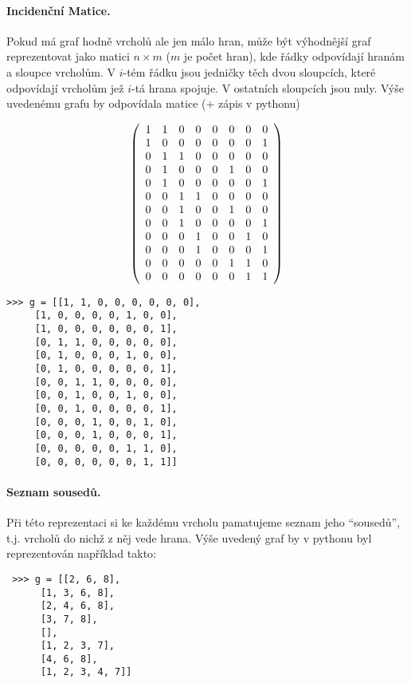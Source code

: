 \paragraph{Incidenční Matice.} Pokud má graf hodně vrcholů ale jen málo hran, může být výhodnější graf reprezentovat jako matici $n\times m$ ($m$ je počet hran), kde řádky
odpovídají hranám a sloupce vrcholům. V $i$-tém řádku jsou jedničky těch dvou sloupcích, které odpovídají vrcholům jež $i$-tá hrana spojuje. V ostatních sloupcích jsou nuly.
Výše uvedenému grafu by odpovídala matice (+ zápis v pythonu)
\begin{center}
\begin{minipage}{3.5cm}
$$
\left(
\begin{array}{cccccccc}
1 & 1 & 0 & 0 & 0 & 0 & 0 & 0\cr
1 & 0 & 0 & 0 & 0 & 0 & 0 & 1\cr
0 & 1 & 1 & 0 & 0 & 0 & 0 & 0\cr
0 & 1 & 0 & 0 & 0 & 1 & 0 & 0\cr
0 & 1 & 0 & 0 & 0 & 0 & 0 & 1\cr
0 & 0 & 1 & 1 & 0 & 0 & 0 & 0\cr
0 & 0 & 1 & 0 & 0 & 1 & 0 & 0\cr
0 & 0 & 1 & 0 & 0 & 0 & 0 & 1\cr
0 & 0 & 0 & 1 & 0 & 0 & 1 & 0\cr
0 & 0 & 0 & 1 & 0 & 0 & 0 & 1\cr
0 & 0 & 0 & 0 & 0 & 1 & 1 & 0\cr
0 & 0 & 0 & 0 & 0 & 0 & 1 & 1\cr
\end{array}
\right)
$$
\end{minipage}
\hskip2cm
\begin{minipage}{7cm}
\begin{verbatim}
>>> g = [[1, 1, 0, 0, 0, 0, 0, 0],
	 [1, 0, 0, 0, 0, 1, 0, 0],
	 [1, 0, 0, 0, 0, 0, 0, 1],
	 [0, 1, 1, 0, 0, 0, 0, 0],
	 [0, 1, 0, 0, 0, 1, 0, 0],
	 [0, 1, 0, 0, 0, 0, 0, 1],
	 [0, 0, 1, 1, 0, 0, 0, 0],
	 [0, 0, 1, 0, 0, 1, 0, 0],
	 [0, 0, 1, 0, 0, 0, 0, 1],
	 [0, 0, 0, 1, 0, 0, 1, 0],
	 [0, 0, 0, 1, 0, 0, 0, 1],
	 [0, 0, 0, 0, 0, 1, 1, 0],
	 [0, 0, 0, 0, 0, 0, 1, 1]]
\end{verbatim}
\end{minipage}
\end{center}

\paragraph{Seznam sousedů.} Při této reprezentaci si ke každému vrcholu pamatujeme seznam jeho ``sousedů'', t.j. vrcholů do nichž z něj vede hrana.
Výše uvedený graf by v pythonu byl reprezentován například takto:

\begin{verbatim}
 >>> g = [[2, 6, 8],
	  [1, 3, 6, 8],
	  [2, 4, 6, 8],
	  [3, 7, 8],
	  [],
	  [1, 2, 3, 7],
	  [4, 6, 8],
	  [1, 2, 3, 4, 7]]
\end{verbatim}

